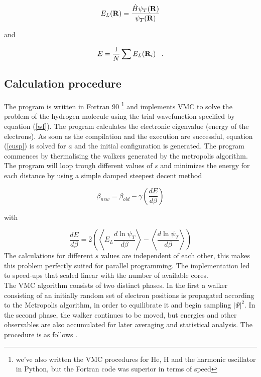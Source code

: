 \documentclass{article}
\begin{document}
\begin{equation}
\label{E_local}
E_{L}({\bf R})=\frac{\hat{H}\psi_{T}({\bf R})}{\psi_{T}({\bf R})}
\end{equation}

and 

\begin{equation}
E=\frac{1}{N} \sum E_{L}({\bf R}_i) \;\;\;.
\end{equation}

\subsection{Calculation procedure}
The program is written in Fortran 90 \footnote{we've also written the VMC procedures for He, H and the harmonic oscillator in Python, but the Fortran code was superior in terms of speed} and implements VMC to solve the  problem of the hydrogen molecule using the trial wavefunction specified by equation (\ref{wf}). The program calculates the electronic eigenvalue (energy of the electrons). As soon as the compilation and the execution are successful, equation (\ref{cusp}) is solved for $a$ and the initial configuration is generated. The program commences by thermalising the walkers generated by the metropolis algorithm. The program will loop trough different values of $s$ and minimizes the energy for each distance by using a simple damped steepest decent method \citep{thijssen2007computational}

\begin{equation}
 \beta_{new}=\beta_{old}-\gamma \left( \frac{dE}{d\beta} \right)
\end{equation}

with 

\begin{equation}
\frac{dE}{d\beta}= 2\left(  \left\langle E_L \frac{d \ln \psi_T }{d \beta} \right\rangle - \left\langle \frac{d \ln \psi_T}{d \beta} \right\rangle \right)
\end{equation}
The calculations for different $s$ values are independent of each other, this makes this problem perfectly suited for parallel programming. The implementation led to speed-ups that scaled linear with the number of available cores.\\

The VMC algorithm consists of two distinct phases. In the first a walker consisting of an initially random set of electron positions is propagated according to the Metropolis algorithm, in order to equilibrate it and begin sampling $\vert\Psi\vert^2$. In the second phase, the walker continues to be moved, but energies and other observables are also accumulated for later averaging and statistical analysis. The procedure is as follows \citep{thijssen2007computational}.
\end{document}
